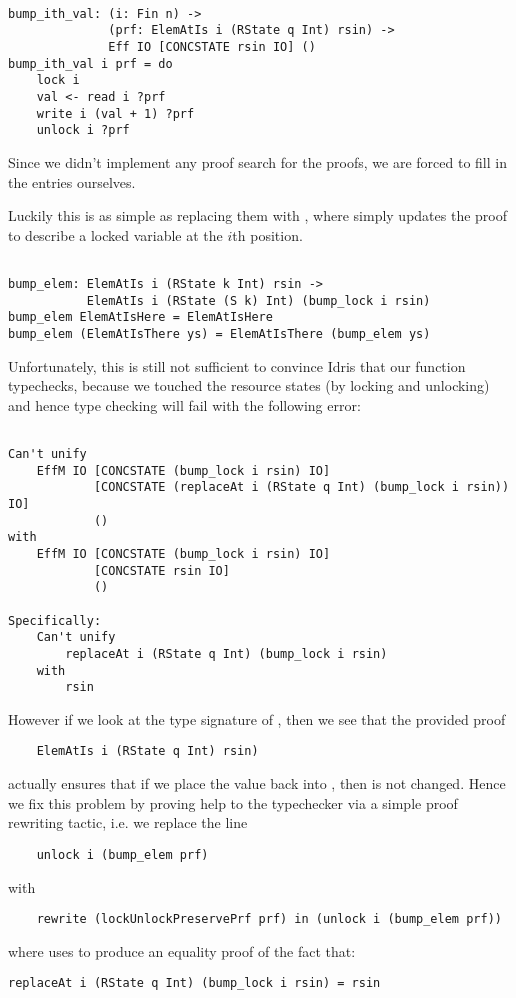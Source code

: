 \begin{BVerbatim}

bump_ith_val: (i: Fin n) ->
              (prf: ElemAtIs i (RState q Int) rsin) ->
              Eff IO [CONCSTATE rsin IO] ()
bump_ith_val i prf = do
    lock i
    val <- read i ?prf
    write i (val + 1) ?prf
    unlock i ?prf

\end{BVerbatim}

Since we didn't implement any proof search for the  proofs,
we are forced to fill in the  entries ourselves.

Luckily this is as simple as replacing them with ,
where  simply updates the  proof to describe
a locked variable at the $i$th position.

\begin{BVerbatim}

bump_elem: ElemAtIs i (RState k Int) rsin ->
           ElemAtIs i (RState (S k) Int) (bump_lock i rsin)
bump_elem ElemAtIsHere = ElemAtIsHere
bump_elem (ElemAtIsThere ys) = ElemAtIsThere (bump_elem ys)

\end{BVerbatim}

Unfortunately, this is still not sufficient to convince Idris that our
function typechecks, because we touched the resource states (by locking and
unlocking) and hence type checking will fail with the following error:

\begin{BVerbatim}

Can't unify
    EffM IO [CONCSTATE (bump_lock i rsin) IO]
            [CONCSTATE (replaceAt i (RState q Int) (bump_lock i rsin)) IO]
            ()
with
    EffM IO [CONCSTATE (bump_lock i rsin) IO]
            [CONCSTATE rsin IO]
            ()

Specifically:
    Can't unify
        replaceAt i (RState q Int) (bump_lock i rsin)
    with
        rsin

\end{BVerbatim}


However if we look at the type signature of , then we
see that the provided proof
\begin{Verbatim}
    ElemAtIs i (RState q Int) rsin)
\end{Verbatim}
actually ensures that if we place the value  back into
, then  is not changed. Hence we fix this problem
by proving help to the typechecker via a simple proof rewriting tactic, i.e.
we replace the line
\begin{Verbatim}
    unlock i (bump_elem prf)
\end{Verbatim}
with
\begin{Verbatim}
    rewrite (lockUnlockPreservePrf prf) in (unlock i (bump_elem prf))
\end{Verbatim}
where  uses  to produce an equality proof
of the fact that:
\begin{Verbatim}
replaceAt i (RState q Int) (bump_lock i rsin) = rsin
\end{Verbatim}

